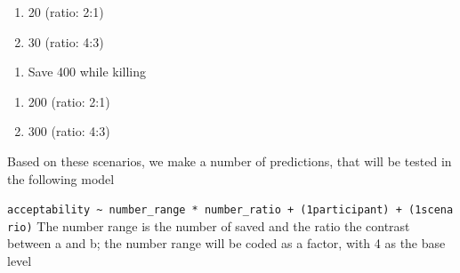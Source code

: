 \documentclass[
]{article}
\providecommand{\tightlist}{%
  \setlength{\itemsep}{0pt}\setlength{\parskip}{0pt}}
\begin{document}
\begin{enumerate}
\def\labelenumi{\alph{enumi}.}
\tightlist
\item
  20 (ratio: 2:1)
\item
  30 (ratio: 4:3)
\end{enumerate}

\begin{enumerate}
\def\labelenumi{\arabic{enumi}.}
\setcounter{enumi}{2}
\tightlist
\item
  Save 400 while killing
\end{enumerate}

\begin{enumerate}
\def\labelenumi{\alph{enumi}.}
\tightlist
\item
  200 (ratio: 2:1)
\item
  300 (ratio: 4:3)
\end{enumerate}

Based on these scenarios, we make a number of predictions, that will be tested in the following model

\textbar{} \texttt{acceptability\ \textasciitilde{}\ number\_range\ *\ number\_ratio\ +\ (1\textbar{}participant)\ +\ (1\textbar{}scenario)} \textbar{} \textbar{} The number range is the number of saved and the ratio the contrast between a and b; \textbar{} \textbar{} the number range will be coded as a factor, with 4 as the base level
\end{document}
